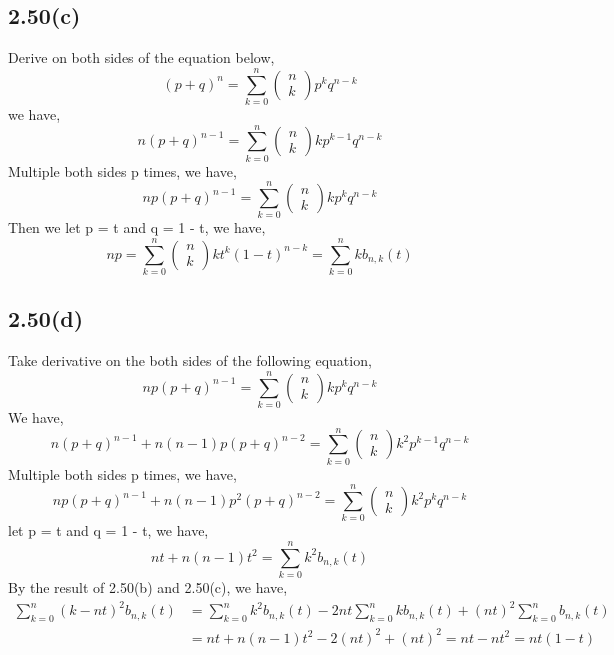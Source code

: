 \documentclass[UTF8]{ctexart}
\begin{document}
\subsection*{2.50(c)}
Derive on both sides of the equation below,
$$(p+q)^{n}=\sum_{k=0}^{n}\left(\begin{array}{l}
n \\
k
\end{array}\right) p^{k} q^{n-k}$$
we have,
$$n(p+q)^{n-1}=\sum_{k=0}^{n}\left(\begin{array}{l}
n \\
k
\end{array}\right) k p^{k-1} q^{n-k}$$
Multiple both sides p times, we have,
$$n p(p+q)^{n-1}=\sum_{k=0}^{n}\left(\begin{array}{l}
n \\
k
\end{array}\right) k p^{k} q^{n-k}$$
Then we let p = t and q = 1 - t, we have, 
$$n p=\sum_{k=0}^{n}\left(\begin{array}{l}
n \\
k
\end{array}\right) k t^{k}(1-t)^{n-k}=\sum_{k=0}^{n} k b_{n, k}(t)$$

\subsection*{2.50(d)}
Take derivative on the both sides of the following equation,
$$n p(p+q)^{n-1}=\sum_{k=0}^{n}\left(\begin{array}{l}
n \\
k
\end{array}\right) k p^{k} q^{n-k}$$
We have,
$$n(p+q)^{n-1}+n(n-1) p(p+q)^{n-2}=\sum_{k=0}^{n}\left(\begin{array}{l}
n \\
k
\end{array}\right) k^{2} p^{k-1} q^{n-k}$$
Multiple both sides p times, we have,
$$n p(p+q)^{n-1}+n(n-1) p^{2}(p+q)^{n-2}=\sum_{k=0}^{n}\left(\begin{array}{l}
n \\
k
\end{array}\right) k^{2} p^{k} q^{n-k}$$
let p = t and q = 1 - t, we have,
$$n t+n(n-1) t^{2}=\sum_{k=0}^{n} k^{2} b_{n, k}(t)$$
By the result of 2.50(b) and 2.50(c), we have,
\begin{equation}
    \begin{aligned}
    \sum_{k=0}^{n}(k-n t)^{2} b_{n, k}(t) &=\sum_{k=0}^{n} k^{2} b_{n, k}(t)-2 n t \sum_{k=0}^{n} k b_{n, k}(t)+(n t)^{2} \sum_{k=0}^{n} b_{n, k}(t) \\
    &=n t+n(n-1) t^{2}-2(n t)^{2}+(n t)^{2}=n t-n t^{2}=n t(1-t)
    \nonumber
\end{aligned}
\end{equation}
\end{document}
